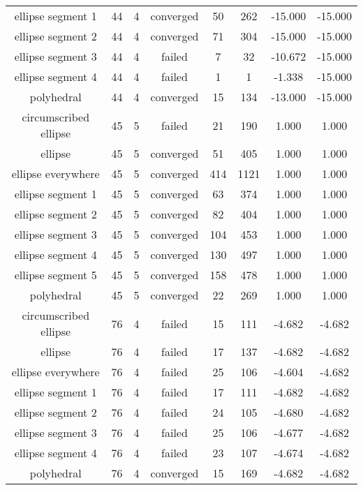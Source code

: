 \begin{scriptsize}
\begin{center}
\begin{longtable}{ c c c c c c c c }
    ellipse segment 1     &   44  &  4  & converged  &   50  &  262  &  -15.000   &  -15.000   \\
    ellipse segment 2     &   44  &  4  & converged  &   71  &  304  &  -15.000   &  -15.000   \\
    ellipse segment 3     &   44  &  4  &   failed   &   7   &   32  &  -10.672   &  -15.000   \\
    ellipse segment 4     &   44  &  4  &   failed   &   1   &   1   &   -1.338   &  -15.000   \\
        polyhedral        &   44  &  4  & converged  &   15  &  134  &  -13.000   &  -15.000   \\
  circumscribed ellipse   &   45  &  5  &   failed   &   21  &  190  &   1.000    &   1.000    \\
         ellipse          &   45  &  5  & converged  &   51  &  405  &   1.000    &   1.000    \\
    ellipse everywhere    &   45  &  5  & converged  &  414  &  1121 &   1.000    &   1.000    \\
    ellipse segment 1     &   45  &  5  & converged  &   63  &  374  &   1.000    &   1.000    \\
    ellipse segment 2     &   45  &  5  & converged  &   82  &  404  &   1.000    &   1.000    \\
    ellipse segment 3     &   45  &  5  & converged  &  104  &  453  &   1.000    &   1.000    \\
    ellipse segment 4     &   45  &  5  & converged  &  130  &  497  &   1.000    &   1.000    \\
    ellipse segment 5     &   45  &  5  & converged  &  158  &  478  &   1.000    &   1.000    \\
        polyhedral        &   45  &  5  & converged  &   22  &  269  &   1.000    &   1.000    \\
  circumscribed ellipse   &   76  &  4  &   failed   &   15  &  111  &   -4.682   &   -4.682   \\
         ellipse          &   76  &  4  &   failed   &   17  &  137  &   -4.682   &   -4.682   \\
    ellipse everywhere    &   76  &  4  &   failed   &   25  &  106  &   -4.604   &   -4.682   \\
    ellipse segment 1     &   76  &  4  &   failed   &   17  &  111  &   -4.682   &   -4.682   \\
    ellipse segment 2     &   76  &  4  &   failed   &   24  &  105  &   -4.680   &   -4.682   \\
    ellipse segment 3     &   76  &  4  &   failed   &   25  &  106  &   -4.677   &   -4.682   \\
    ellipse segment 4     &   76  &  4  &   failed   &   23  &  107  &   -4.674   &   -4.682   \\
        polyhedral        &   76  &  4  & converged  &   15  &  169  &   -4.682   &   -4.682
\end{longtable}
\end{center}
\end{scriptsize}
